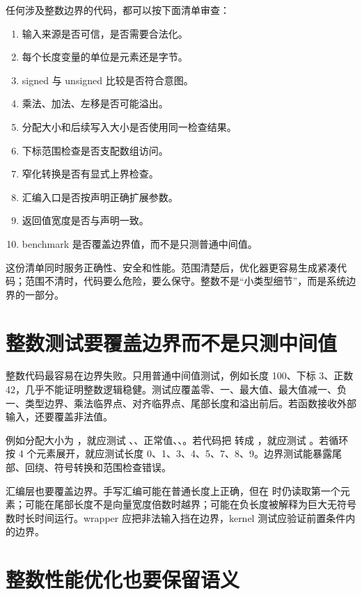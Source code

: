 任何涉及整数边界的代码，都可以按下面清单审查：

\begin{enumerate}
  \item 输入来源是否可信，是否需要合法化。
  \item 每个长度变量的单位是元素还是字节。
  \item signed 与 unsigned 比较是否符合意图。
  \item 乘法、加法、左移是否可能溢出。
  \item 分配大小和后续写入大小是否使用同一检查结果。
  \item 下标范围检查是否支配数组访问。
  \item 窄化转换是否有显式上界检查。
  \item 汇编入口是否按声明正确扩展参数。
  \item 返回值宽度是否与声明一致。
  \item benchmark 是否覆盖边界值，而不是只测普通中间值。
\end{enumerate}

这份清单同时服务正确性、安全和性能。范围清楚后，优化器更容易生成紧凑代码；范围不清时，代码要么危险，要么保守。整数不是“小类型细节”，而是系统边界的一部分。

\section{整数测试要覆盖边界而不是只测中间值}

整数代码最容易在边界失败。只用普通中间值测试，例如长度 100、下标 3、正数 42，几乎不能证明整数逻辑稳健。测试应覆盖零、一、最大值、最大值减一、负一、类型边界、乘法临界点、对齐临界点、尾部长度和溢出前后。若函数接收外部输入，还要覆盖非法值。

例如分配大小为 ，就应测试 、、正常值、、。若代码把  转成 ，就应测试 。若循环按 4 个元素展开，就应测试长度 0、1、3、4、5、7、8、9。边界测试能暴露尾部、回绕、符号转换和范围检查错误。

汇编层也要覆盖边界。手写汇编可能在普通长度上正确，但在  时仍读取第一个元素；可能在尾部长度不是向量宽度倍数时越界；可能在负长度被解释为巨大无符号数时长时间运行。wrapper 应把非法输入挡在边界，kernel 测试应验证前置条件内的边界。

\section{整数性能优化也要保留语义}

